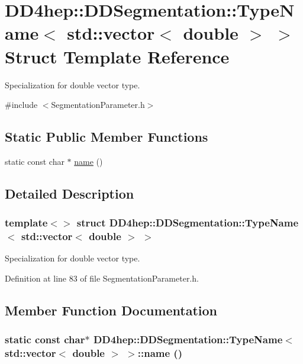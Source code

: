\hypertarget{struct_d_d4hep_1_1_d_d_segmentation_1_1_type_name_3_01std_1_1vector_3_01double_01_4_01_4}{
\section{DD4hep::DDSegmentation::TypeName$<$ std::vector$<$ double $>$ $>$ Struct Template Reference}
\label{struct_d_d4hep_1_1_d_d_segmentation_1_1_type_name_3_01std_1_1vector_3_01double_01_4_01_4}
}


Specialization for double vector type.  


{\ttfamily \#include $<$SegmentationParameter.h$>$}\subsection*{Static Public Member Functions}
\begin{DoxyCompactItemize}
\item 
static const char $\ast$ \hyperlink{struct_d_d4hep_1_1_d_d_segmentation_1_1_type_name_3_01std_1_1vector_3_01double_01_4_01_4_aaa73077623b1de1a73e9e69c44a7131a}{name} ()
\end{DoxyCompactItemize}


\subsection{Detailed Description}
\subsubsection*{template$<$$>$ struct DD4hep::DDSegmentation::TypeName$<$ std::vector$<$ double $>$ $>$}

Specialization for double vector type. 

Definition at line 83 of file SegmentationParameter.h.

\subsection{Member Function Documentation}
\hypertarget{struct_d_d4hep_1_1_d_d_segmentation_1_1_type_name_3_01std_1_1vector_3_01double_01_4_01_4_aaa73077623b1de1a73e9e69c44a7131a}{
\subsubsection[{name}]{\setlength{\rightskip}{0pt plus 5cm}static const char$\ast$ {\bf DD4hep::DDSegmentation::TypeName}$<$ std::vector$<$ double $>$ $>$::name ()}}
\label{struct_d_d4hep_1_1_d_d_segmentation_1_1_type_name_3_01std_1_1vector_3_01double_01_4_01_4_aaa73077623b1de1a73e9e69c44a7131a}


